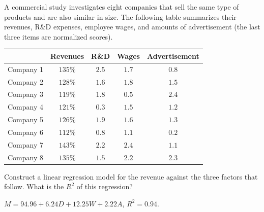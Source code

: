 \begin{Exercise}
A commercial study investigates eight companies that sell the same type of products and are also similar in size. The following table summarizes their revenues, R\&D expenses, employee wages, and amounts of advertisement (the last three items are normalized scores).
\begin{center}
\begin{tabular}{|c|c|c|c|c|}
\hline
& Revenues & R\&D & Wages & Advertisement \\
\hline
Company 1 & $135\%$ & $2.5$ & $1.7$ & $0.8$ \\
\hline
Company 2 & $128\%$ & $1.6$ & $1.8$ & $1.5$ \\
\hline
Company 3 & $119\%$ & $1.8$ & $0.5$ & $2.4$ \\
\hline
Company 4 & $121\%$ & $0.3$ & $1.5$ & $1.2$ \\
\hline
Company 5 & $126\%$ & $1.9$ & $1.6$ & $1.3$ \\
\hline
Company 6 & $112\%$ & $0.8$ & $1.1$ & $0.2$ \\
\hline
Company 7 & $143\%$ & $2.2$ & $2.4$ & $1.1$ \\
\hline
Company 8 & $135\%$ & $1.5$ & $2.2$ & $2.3$ \\
\hline
\end{tabular}
\end{center}
Construct a linear regression model for the revenue against the three factors that follow. What is the $R^2$ of this regression?
\end{Exercise} 
\begin{Answer}
$M = 94.96 + 6.24D + 12.25W + 2.22A$, $R^2 = 0.94$.
\end{Answer}